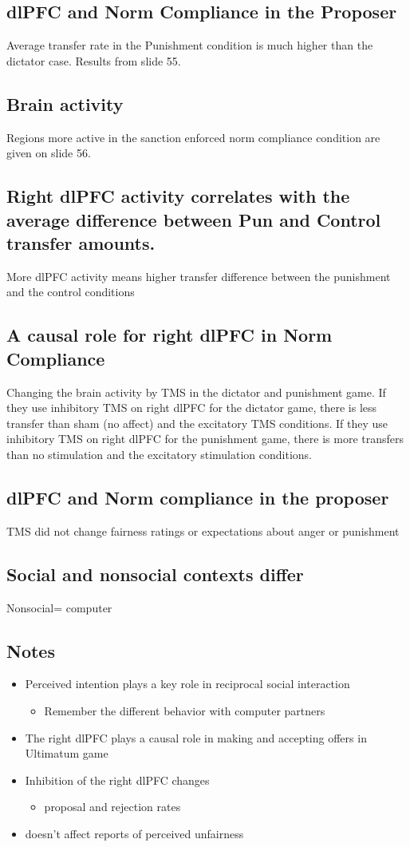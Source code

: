  \subsection{dlPFC and Norm Compliance in the Proposer}
 Average transfer rate in the Punishment condition is much higher than the dictator case. Results from slide 55.

\subsection{Brain activity}
Regions more active in the sanction enforced norm compliance condition are given on slide 56.

\subsection{Right dlPFC activity correlates with the average difference between Pun and Control transfer amounts.}
More dlPFC activity means higher  transfer difference between the punishment and the control conditions
\subsection{A causal role for right dlPFC in Norm Compliance}
Changing the brain activity by TMS in the dictator and punishment game. If they use inhibitory TMS on right dlPFC for the dictator game, there is less transfer than sham (no affect) and the excitatory TMS conditions. If they use inhibitory TMS on right dlPFC for the punishment game, there is more transfers than no stimulation and the excitatory stimulation conditions.
\subsection{dlPFC and Norm compliance in the proposer}
TMS did not change fairness ratings or expectations about anger or punishment
\subsection{Social and nonsocial contexts differ}
Nonsocial= computer
\subsection{Notes}
\begin{itemize}
    \item Perceived intention plays a key role in reciprocal social interaction
    \begin{itemize}
        \item Remember the different behavior with computer partners
    \end{itemize}
    \item The right dlPFC plays a causal role in making and accepting offers in Ultimatum game
    \item Inhibition of the right dlPFC changes
    \begin{itemize}
        \item proposal and rejection rates
        
    \end{itemize}
    \item doesn't affect reports of perceived unfairness
\end{itemize}
